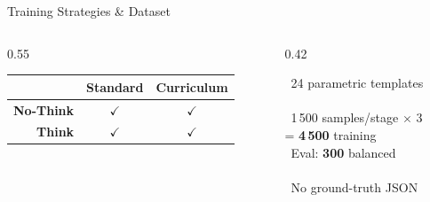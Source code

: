 \documentclass[10pt, aspectratio=169]{beamer}
\begin{document}
\begin{frame}{Training Strategies \& Dataset}
\begin{columns}[T]
\begin{column}{0.55\textwidth}
      \vspace{0.8em}
      \renewcommand{\arraystretch}{1.5}
      \centering\small
      \begin{tabular}{@{}r|c|c@{}}
                          & \textbf{Standard} & \textbf{Curriculum} \\
        \hline
        \textbf{No-Think} & \cellcolor{sky!10}$\checkmark$ & \cellcolor{sky!10}$\checkmark$ \\
        \hline
        \textbf{Think}    & \cellcolor{sky!10}$\checkmark$ & \cellcolor{sky!10}$\checkmark$ \\
      \end{tabular}
    \end{column}
    \begin{column}{0.42\textwidth}
      \begin{tcolorbox}[insightbox=navy, title={\small Dataset}]
        \small
        \textcolor{sky}{\faFile}~24 parametric templates\\\hspace*{1.2em}{\scriptsize(8 per difficulty tier)}\\[0.35em]
        \textcolor{sky}{\faLayerGroup}~1\,500 samples/stage $\times$ 3\\\hspace*{1.2em}= \textbf{4\,500} training\\[0.35em]
        \textcolor{sky}{\faChartBar}~Eval: \textbf{300} balanced\\\hspace*{1.2em}{\scriptsize(100 S / 100 M / 100 H)}\\[0.35em]
        \textcolor{sky}{\faBan}~No ground-truth JSON\\\hspace*{1.2em}{\scriptsize reward evaluates directly}
      \end{tcolorbox}
    \end{column}
  \end{columns}
\end{frame}
\end{document}
